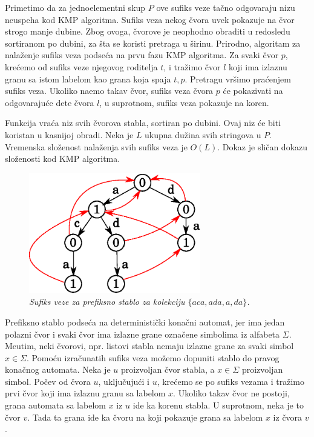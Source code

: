 Primetimo da za jednoelementni skup $P$ ove sufiks veze ta\v cno odgovaraju nizu neuspeha kod KMP algoritma. Sufiks veza nekog \v cvora uvek pokazuje na \v cvor strogo manje dubine. Zbog ovoga, \v cvorove je neophodno obraditi u redosledu sortiranom po dubini, za \v sta se koristi pretraga u \v sirinu. Prirodno, algoritam za nala\v zenje sufiks veza podse\' ca na prvu fazu KMP algoritma. Za svaki \v cvor $p$, kre\' cemo od sufiks veze njegovog roditelja $t$, i tra\v zimo \v cvor $l$ koji ima izlaznu granu sa istom labelom kao grana koja spaja $t,p$. Pretragu vr\v simo pra\' cenjem sufiks veza. Ukoliko na\dj emo takav \v cvor, sufiks veza \v cvora $p$ \' ce pokazivati na odgovaraju\' ce dete \v cvora $l$, u suprotnom, sufiks veza pokazuje na koren.

\noindent
\begin{minipage}[l]{\textwidth}

\end{minipage}

Funkcija vra\' ca niz svih \v cvorova stabla, sortiran po dubini. Ovaj niz \' ce biti koristan u kasnijoj obradi. Neka je $L$ ukupna du\v zina svih stringova u $P$. Vremenska slo\v zenost nala\v zenja svih sufiks veza je $O(L)$\cite{ahorad}. Dokaz je sli\v can dokazu slo\v zenosti kod KMP algoritma.

\begin{figure}[H]
    \centering
    \includegraphics[width=75mm]{../img/aho1.eps}
    \caption*{\textit{Sufiks veze za prefiksno stablo za kolekciju $\{aca,ada,a,da\}$.}}
\end{figure}

Prefiksno stablo podse\' ca na deterministi\v cki kona\v cni automat, jer ima jedan polazni \v cvor i svaki \v cvor ima izlazne grane ozna\v cene simbolima iz alfabeta $\Sigma$. Me\dj utim, neki \v cvorovi, npr. listovi stabla nemaju izlazne grane za svaki simbol $x \in \Sigma$. Pomo\' cu izra\v cunatih sufiks veza mo\v zemo dopuniti stablo do pravog kona\v cnog automata. Neka je $u$ proizvoljan \v cvor stabla, a $x \in \Sigma$ proizvoljan simbol. Po\v cev od \v cvora $u$, uklju\v cuju\' ci i $u$, kre\' cemo se po sufiks vezama i tra\v zimo prvi \v cvor koji ima izlaznu granu sa labelom $x$. Ukoliko takav \v cvor ne postoji, grana automata sa labelom $x$ iz $u$ ide ka korenu stabla. U suprotnom, neka je to \v cvor $v$. Tada ta grana ide ka \v cvoru na koji pokazuje grana sa labelom $x$ iz \v cvora $v$.

